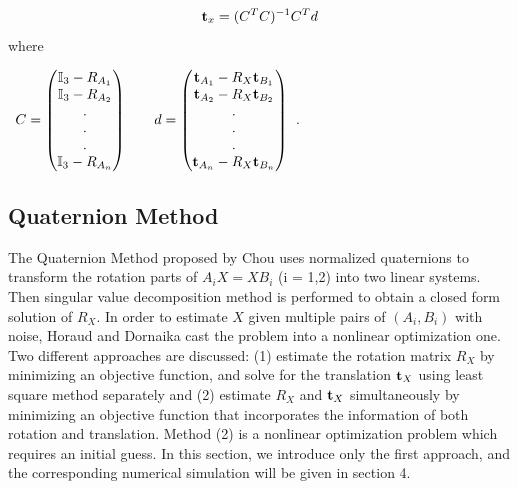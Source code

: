 \documentclass[twocolumn,10pt]{asme2ej}
\newcommand{\ttt}{{\bf t}}
\begin{document}
\begin{equation}
\ttt_{x} = (C^{T}C)^{-1}C^{T}d
\label{t_least}
\end{equation}
where\\

\begin{center}
$\begin{array}{lr}
C = \begin{pmatrix}
\mathbb{I}_{3} - R_{{A_{1}}}\\
\mathbb{I}_{3} - R_{{A_{2}}}\\
.\\
.\\
.\\
\mathbb{I}_{3} - R_{{A_{n}}}\\
\end{pmatrix}
\; \; 
& \; \;
d = \begin{pmatrix}
\ttt_{A_{1}} - R_{X}\ttt_{B_{1}}\\
\ttt_{A_{2}} - R_{X}\ttt_{B_{2}}\\.\\
.\\
.\\
\ttt_{A_{n}} - R_{X}\ttt_{B_{n}}\\\end{pmatrix} 
\end{array}$.
\end{center}


\subsection{Quaternion Method }
The Quaternion Method proposed by Chou \cite{chou1991finding} uses normalized quaternions to transform the rotation parts of $A_{i}X = XB_{i}$ (i = 1,2) into two linear systems. Then singular value decomposition method is performed to obtain a closed form solution of $R_{X}$. In order to estimate $X$ given multiple pairs of $(A_{i}, B_{i})$ with noise, Horaud and Dornaika \cite{horaud1995hand} cast the problem into a nonlinear optimization one. Two different approaches are discussed: (1) estimate the rotation matrix $R_{X}$ by minimizing an objective function, and solve for the translation $\ttt_{X}$ using least square method separately and (2) estimate $R_{X}$ and $\ttt_{X}$ simultaneously by minimizing an objective function that incorporates the information of both rotation and translation. Method (2) is a nonlinear optimization problem which requires an initial guess. In this section, we introduce only the first approach, and the corresponding numerical simulation will be given in section 4.
\end{document}
